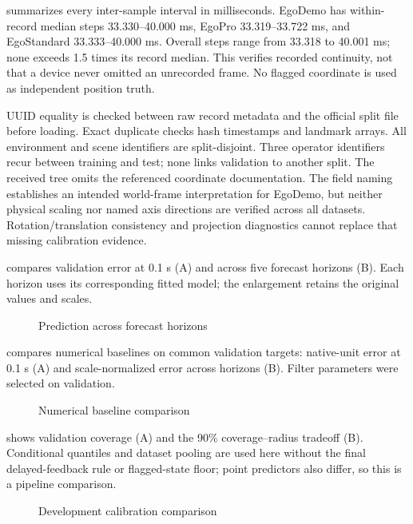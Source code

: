  summarizes every inter-sample interval in milliseconds. EgoDemo has within-record median steps 33.330--40.000 ms, EgoPro 33.319--33.722 ms, and EgoStandard 33.333--40.000 ms. Overall steps range from 33.318 to 40.001 ms; none exceeds 1.5 times its record median. This verifies recorded continuity, not that a device never omitted an unrecorded frame. No flagged coordinate is used as independent position truth.


UUID equality is checked between raw record metadata and the official split file before loading. Exact duplicate checks hash timestamps and landmark arrays. All environment and scene identifiers are split-disjoint. Three operator identifiers recur between training and test; none links validation to another split. The received tree omits the referenced coordinate documentation. The field naming establishes an intended world-frame interpretation for EgoDemo, but neither physical scaling nor named axis directions are verified across all datasets. Rotation/translation consistency and projection diagnostics cannot replace that missing calibration evidence.
\FloatBarrier

 compares validation error at 0.1 s (A) and across five forecast horizons (B). Each horizon uses its corresponding fitted model; the enlargement retains the original values and scales.
\begin{figure}[!htbp]
\centering
{}
\caption{Prediction across forecast horizons}
\label{fig:A1}
\end{figure}
\FloatBarrier

 compares numerical baselines on common validation targets: native-unit error at 0.1 s (A) and scale-normalized error across horizons (B). Filter parameters were selected on validation.
\begin{figure}[!htbp]
\centering
{}
\caption{Numerical baseline comparison}
\label{fig:A2}
\end{figure}
\FloatBarrier

 shows validation coverage (A) and the 90\% coverage--radius tradeoff (B). Conditional quantiles and dataset pooling are used here without the final delayed-feedback rule or flagged-state floor; point predictors also differ, so this is a pipeline comparison.
\begin{figure}[!htbp]
\centering
{}
\caption{Development calibration comparison}
\label{fig:A3}
\end{figure}
\FloatBarrier

